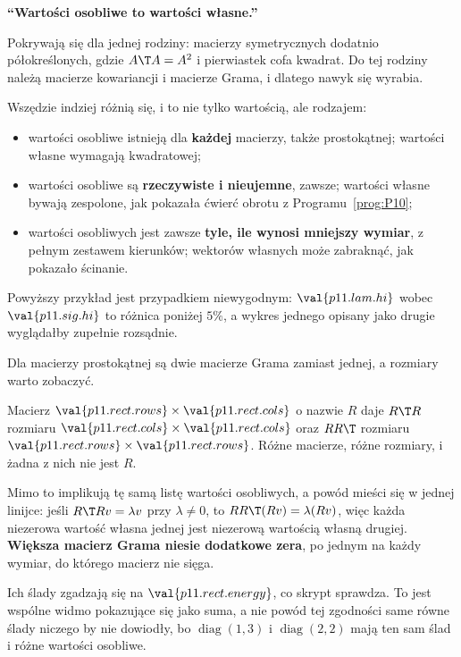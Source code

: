 \begin{trapbox}
\textbf{\enquote{Wartości osobliwe to wartości własne.}}

Pokrywają się dla jednej rodziny: macierzy symetrycznych dodatnio
półokreślonych, gdzie $A\T A = A^{2}$ i pierwiastek cofa kwadrat. Do tej
rodziny należą macierze kowariancji i macierze Grama, i dlatego nawyk się
wyrabia.

Wszędzie indziej różnią się, i to nie tylko wartością, ale rodzajem:

\begin{itemize}
\item wartości osobliwe istnieją dla \textbf{każdej} macierzy, także
  prostokątnej; wartości własne wymagają kwadratowej;
\item wartości osobliwe są \textbf{rzeczywiste i nieujemne}, zawsze; wartości
  własne bywają zespolone, jak pokazała ćwierć obrotu z
  Programu~\ref{prog:P10};
\item wartości osobliwych jest zawsze \textbf{tyle, ile wynosi mniejszy
  wymiar}, z pełnym zestawem kierunków; wektorów własnych może zabraknąć, jak
  pokazało ścinanie.
\end{itemize}

Powyższy przykład jest przypadkiem niewygodnym: $\val{p11.lam.hi}$ wobec
$\val{p11.sig.hi}$ to różnica poniżej $5\%$, a wykres jednego opisany jako
drugie wyglądałby zupełnie rozsądnie.
\end{trapbox}

\begin{fr}
Dla macierzy prostokątnej są dwie macierze Grama zamiast jednej, a rozmiary
warto zobaczyć.

Macierz $\val{p11.rect.rows} \times \val{p11.rect.cols}$ o nazwie $R$ daje
$R\T R$ rozmiaru $\val{p11.rect.cols} \times \val{p11.rect.cols}$ oraz $RR\T$
rozmiaru $\val{p11.rect.rows} \times \val{p11.rect.rows}$. Różne macierze,
różne rozmiary, i żadna z nich nie jest $R$.

Mimo to implikują tę samą listę wartości osobliwych, a powód mieści się w
jednej linijce: jeśli $R\T R v = \lambda v$ przy $\lambda \ne 0$, to
$RR\T(Rv) = \lambda(Rv)$, więc każda niezerowa wartość własna jednej jest
niezerową wartością własną drugiej. \textbf{Większa macierz Grama niesie
dodatkowe zera}, po jednym na każdy wymiar, do którego macierz nie sięga.

Ich ślady zgadzają się na $\val{p11.rect.energy}$, co skrypt sprawdza. To jest
wspólne widmo pokazujące się jako suma, a nie powód tej zgodności \dash{} same
równe ślady niczego by nie dowiodły, bo $\operatorname{diag}(1, 3)$ i
$\operatorname{diag}(2, 2)$ mają ten sam ślad i różne wartości osobliwe.
\end{fr}

